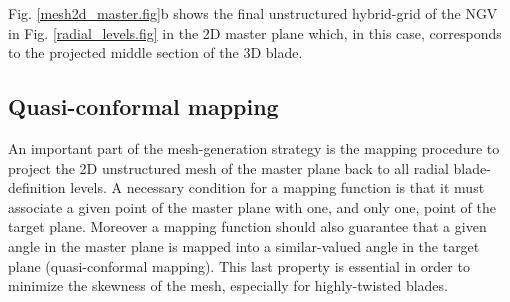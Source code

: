  Fig. \ref{mesh2d_master.fig}b shows the final unstructured hybrid-grid
 of the NGV in Fig. \ref{radial_levels.fig}
 in the 2D master plane which, in this case, corresponds to the projected
 middle section of the 3D blade.

%
%
\subsection{Quasi-conformal mapping}
%
 An important part of the mesh-generation strategy is
 the mapping procedure to project the 2D unstructured mesh of
 the master plane back to all radial blade-definition levels.
 A necessary condition for a mapping function is that
 it must associate a given point of the master plane with one,
 and only one, point of the target plane.
 Moreover a mapping function should also guarantee
 that a given angle in the master plane is mapped into a similar-valued angle
 in the target plane (quasi-conformal mapping). This last property is essential
 in order to minimize the skewness of the mesh, especially for
 highly-twisted blades.

